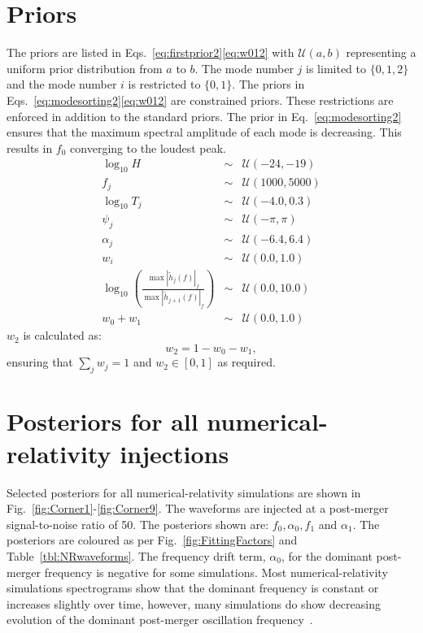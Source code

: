 \documentclass[../Thesis.tex]{subfiles}
\begin{document}
\begin{subappendices}
\section{Priors}
\label{appendix:b2}
    The priors are listed in Eqs.~\ref{eq:firstprior2}\Hyphdash*\ref{eq:w012} with $\mathcal{U}(a,b)$ representing a uniform prior distribution from $a$ to $b$. 
    The mode number $j$ is limited to $\lbrace 0,1,2 \rbrace$ and the mode number $i$ is restricted to $\lbrace 0,1 \rbrace$. 
    The priors in Eqs.~\ref{eq:modesorting2}\Hyphdash*\ref{eq:w012} are constrained priors. 
    These restrictions are enforced in addition to the standard priors. The prior in Eq.~\ref{eq:modesorting2} ensures that the maximum spectral amplitude of each mode is decreasing. 
    This results in $f_0$ converging to the loudest peak. 
    \begin{eqnarray}
        \log_{10}{H} & \sim & \mathcal{U}(-24, -19)\label{eq:firstprior2}  \\
        f_j & \sim & \mathcal{U}(1000,5000) \\
        \log_{10}T_j & \sim & \mathcal{U}(-4.0,0.3)\\
        \psi_j & \sim & \mathcal{U}(-\pi,\pi) \\
        \alpha_j & \sim & \mathcal{U}(-6.4,6.4) \\
        w_i & \sim & \mathcal{U}(0.0,1.0)\label{eq:lastprior2}\\
        \log_{10}\left(\frac{\max|\tilde{h}_{j}(f)|_f}
        {\max|\tilde{h}_{j+1}(f)|_f}\right) & \sim & \mathcal{U}(0.0,10.0)\label{eq:modesorting2} \\
        w_0+w_1 & \sim & \mathcal{U}(0.0,1.0) \label{eq:w012}
    \end{eqnarray}
    $w_2$ is calculated as:
    \begin{equation}
        w_2 = 1 - w_0 - w_1,\label{eq:w0122}
    \end{equation}
    ensuring that $\sum_j w_j = 1$ and $w_2\in[0,1]$ as required. 
\section{Posteriors for all numerical-relativity injections}
\label{appendix:c2}  
Selected posteriors for all numerical-relativity simulations are shown in Fig.~\ref{fig:Corner1}-\ref{fig:Corner9}. 
The waveforms are injected at a post-merger signal-to-noise ratio of 50.
The posteriors shown are: $f_0, \alpha_0, f_1$ and $\alpha_1$. 
The posteriors are coloured as per Fig.~\ref{fig:FittingFactors} and Table~\ref{tbl:NRwaveforms}. 
The frequency drift term, $\alpha_0$, for the dominant post-merger frequency is negative for some simulations.
Most numerical-relativity simulations spectrograms show that the dominant frequency is constant or increases slightly over time, however, many simulations do show decreasing evolution of the dominant post-merger oscillation frequency~\cite[e.g.,][]{Foucart2016,Radice2017a,Dietrich2019b}.


\end{subappendices}
\end{document}
